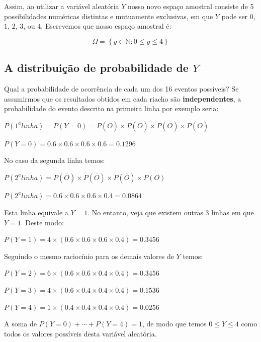 \documentclass[
]{book}
\begin{document}
Assim, ao utilizar a variável aleatória \(Y\) nosso novo espaço amostral consiste de 5 possibilidades numéricas distintas e mutuamente exclusivas, em que \(Y\) pode ser \(0\), \(1\), \(2\), \(3\), ou \(4\). Escrevemos que nosso espaço amostral é:

\[\Omega = \left\{ y \in \mathbb{N}: 0 \le y \le 4 \right\}\]

\hypertarget{a-distribuiuxe7uxe3o-de-probabilidade-de-y}{%
\subsection*{\texorpdfstring{A distribuição de probabilidade de \(Y\)}{A distribuição de probabilidade de Y}}\label{a-distribuiuxe7uxe3o-de-probabilidade-de-y}}

Qual a probabilidade de ocorrência de cada um dos 16 eventos possíveis? Se assumirmos que os resultados obtidos em cada riacho são \textbf{independentes}, a probabilidade do evento descrito na primeira linha por exemplo seria:

\(P(1^a linha) = P(Y = 0) = P(\overline{O}) \times P(\overline{O}) \times P(\overline{O}) \times P(\overline{O})\)

\(P(Y = 0) = 0.6 \times 0.6 \times 0.6 \times 0.6 = 0.1296\)

No caso da segunda linha temos:

\(P(2^a linha) = P(\overline{O}) \times P(\overline{O}) \times P(\overline{O}) \times P(O)\)

\(P(2^a linha) = 0.6 \times 0.6 \times 0.6 \times 0.4 = 0.0864\)

Esta linha equivale a \(Y = 1\). No entanto, veja que existem outras 3 linhas em que \(Y = 1\). Deste modo:

\(P(Y = 1) = 4 \times (0.6 \times 0.6 \times 0.6 \times 0.4) = 0.3456\)

Seguindo o mesmo raciocínio para os demais valores de \(Y\) temos:

\(P(Y = 2) = 6 \times (0.6 \times 0.6 \times 0.4 \times 0.4) = 0.3456\)

\(P(Y = 3) = 4 \times (0.6 \times 0.4 \times 0.4 \times 0.4) = 0.1536\)

\(P(Y = 4) = 1 \times (0.4 \times 0.4 \times 0.4 \times 0.4) = 0.0256\)

A soma de \(P(Y = 0) + \cdots + P(Y = 4) = 1\), de modo que temos \(0 \le Y \le 4\) como todos os valores possíveis desta variável aleatória.
\end{document}
